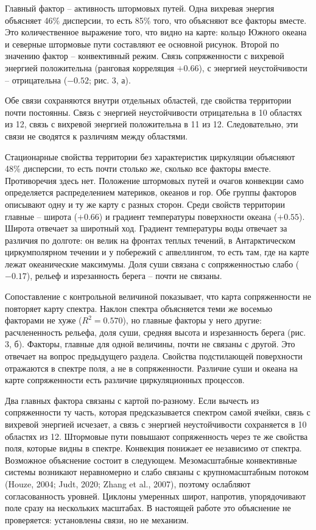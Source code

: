 \documentclass[12pt,a4paper]{article}
\begin{document}
Главный фактор -- активность штормовых путей. Одна вихревая энергия объясняет 46\% дисперсии, то есть 85\% того, что объясняют все факторы вместе. Это количественное выражение того, что видно на карте: кольцо Южного океана и северные штормовые пути составляют ее основной рисунок. Второй по значению фактор -- конвективный режим. Связь сопряженности с вихревой энергией положительна (ранговая корреляция $+0.66$), с энергией неустойчивости -- отрицательна ($-0.52$; рис. 3, а).

Обе связи сохраняются внутри отдельных областей, где свойства территории почти постоянны. Связь с энергией неустойчивости отрицательна в 10 областях из 12, связь с вихревой энергией положительна в 11 из 12. Следовательно, эти связи не сводятся к различиям между областями.

Стационарные свойства территории без характеристик циркуляции объясняют 48\% дисперсии, то есть почти столько же, сколько все факторы вместе. Противоречия здесь нет. Положение штормовых путей и очагов конвекции само определяется распределением материков, океанов и гор. Обе группы факторов описывают одну и ту же карту с разных сторон. Среди свойств территории главные -- широта ($+0.66$) и градиент температуры поверхности океана ($+0.55$). Широта отвечает за широтный ход. Градиент температуры воды отвечает за различия по долготе: он велик на фронтах теплых течений, в Антарктическом циркумполярном течении и у побережий с апвеллингом, то есть там, где на карте лежат океанические максимумы. Доля суши связана с сопряженностью слабо ($-0.17$), рельеф и изрезанность берега -- почти не связаны.

Сопоставление с контрольной величиной показывает, что карта сопряженности не повторяет карту спектра. Наклон спектра объясняется теми же восемью факторами не хуже ($R^2 = 0.570$), но главные факторы у него другие: расчлененность рельефа, доля суши, средняя высота и изрезанность берега (рис. 3, б). Факторы, главные для одной величины, почти не связаны с другой. Это отвечает на вопрос предыдущего раздела. Свойства подстилающей поверхности отражаются в спектре поля, а не в сопряженности. Различие суши и океана на карте сопряженности есть различие циркуляционных процессов.

Два главных фактора связаны с картой по-разному. Если вычесть из сопряженности ту часть, которая предсказывается спектром самой ячейки, связь с вихревой энергией исчезает, а связь с энергией неустойчивости сохраняется в 10 областях из 12. Штормовые пути повышают сопряженность через те же свойства поля, которые видны в спектре. Конвекция понижает ее независимо от спектра. Возможное объяснение состоит в следующем. Мезомасштабные конвективные системы возникают неравномерно и слабо связаны с крупномасштабным потоком (Houze, 2004; Judt, 2020; Zhang et al., 2007), поэтому ослабляют согласованность уровней. Циклоны умеренных широт, напротив, упорядочивают поле сразу на нескольких масштабах. В настоящей работе это объяснение не проверяется: установлены связи, но не механизм.
\end{document}
